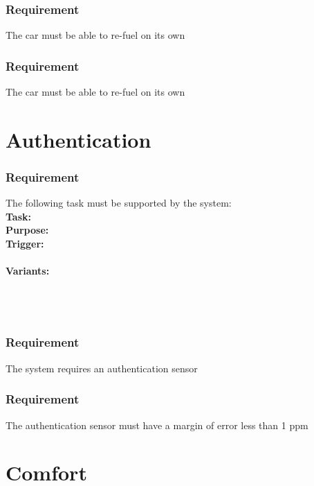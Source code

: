\documentclass{article}
\begin{document}
{      \subsubsection{Requirement}
\hfill \break 
\- \- \-The car must be able to re-fuel on its own
      \subsubsection{Requirement}
\hfill \break 
\- \- \-The car must be able to re-fuel on its own

\section{Authentication}
\setcounter{subsubsection}{0}
\subsubsection {Requirement}
\hfill \break 
\- \- \-The following task must be supported by the system:\\
\hfill \break 
\textbf{Task:} \\
\textbf{Purpose:} \\
\textbf{Trigger:} \\
\\
\noindent
\textbf{Variants:}     \\
\tab{ }  \\
\tab{ }  \\
\tab{ }  \\
\tab{ }   

    \subsubsection{Requirement}
\hfill \break 
\- \- \-The system requires an authentication sensor
    \subsubsection{Requirement}
\hfill \break 
\- \- \-The authentication sensor must have a margin of error less than 1 ppm
\bigskip

\section{Comfort}
\setcounter{subsubsection}{0}
}
\end{document}
